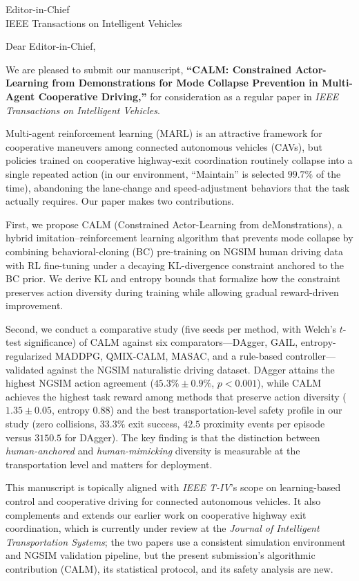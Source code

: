 \documentclass[11pt]{letter}
\begin{document}
\begin{letter}{Editor-in-Chief \\ IEEE Transactions on Intelligent Vehicles}

\opening{Dear Editor-in-Chief,}

We are pleased to submit our manuscript, \textbf{``CALM: Constrained Actor-Learning from Demonstrations for Mode Collapse Prevention in Multi-Agent Cooperative Driving,''} for consideration as a regular paper in \emph{IEEE Transactions on Intelligent Vehicles}.

Multi-agent reinforcement learning (MARL) is an attractive framework for cooperative maneuvers among connected autonomous vehicles (CAVs), but policies trained on cooperative highway-exit coordination routinely collapse into a single repeated action (in our environment, ``Maintain'' is selected $99.7\%$ of the time), abandoning the lane-change and speed-adjustment behaviors that the task actually requires. Our paper makes two contributions.

First, we propose CALM (Constrained Actor-Learning from deMonstrations), a hybrid imitation--reinforcement learning algorithm that prevents mode collapse by combining behavioral-cloning (BC) pre-training on NGSIM human driving data with RL fine-tuning under a decaying KL-divergence constraint anchored to the BC prior. We derive KL and entropy bounds that formalize how the constraint preserves action diversity during training while allowing gradual reward-driven improvement.

Second, we conduct a comparative study (five seeds per method, with Welch's $t$-test significance) of CALM against six comparators---DAgger, GAIL, entropy-regularized MADDPG, QMIX-CALM, MASAC, and a rule-based controller---validated against the NGSIM naturalistic driving dataset. DAgger attains the highest NGSIM action agreement ($45.3\% \pm 0.9\%$, $p < 0.001$), while CALM achieves the highest task reward among methods that preserve action diversity ($1.35 \pm 0.05$, entropy $0.88$) and the best transportation-level safety profile in our study (zero collisions, $33.3\%$ exit success, $42.5$ proximity events per episode versus $3150.5$ for DAgger). The key finding is that the distinction between \emph{human-anchored} and \emph{human-mimicking} diversity is measurable at the transportation level and matters for deployment.

This manuscript is topically aligned with \emph{IEEE T-IV}'s scope on learning-based control and cooperative driving for connected autonomous vehicles. It also complements and extends our earlier work on cooperative highway exit coordination, which is currently under review at the \emph{Journal of Intelligent Transportation Systems}; the two papers use a consistent simulation environment and NGSIM validation pipeline, but the present submission's algorithmic contribution (CALM), its statistical protocol, and its safety analysis are new.


\end{letter}
\end{document}
